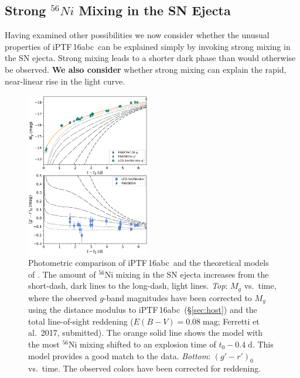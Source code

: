 \documentclass[twocolumn]{aastex61}
\newcommand{\abc}{iPTF\,16abc}
\begin{document}
\subsection{Strong $^{56}Ni$ Mixing in the SN Ejecta}
\label{sec:Ni_mixing}

Having examined other possibilities we now consider whether the unusual
properties of \abc\ can be explained simply by invoking strong mixing in the
SN ejecta. Strong mixing leads to a shorter dark phase than would otherwise
be observed. \textbf{We also consider} whether strong mixing can explain the
rapid, near-linear rise in the light curve.

\begin{figure}[]
  \centering
  \includegraphics[width=0.48\textwidth]{iPTF16abc_Ni_lc.pdf}
  \caption{Photometric comparison of \abc\ and the theoretical 
  models of \citet{2016ApJ...826...96P}. The amount of $^{56}$Ni 
  mixing in the SN ejecta increases from the short-dash, dark lines 
  to the long-dash, light lines.
  \textit{Top}: $M_g$ vs.\ time, where the observed $g$-band 
  magnitudes  
  have been corrected to $M_g$ using the distance modulus to \abc\ 
  (\S\ref{sec:host})
  and the total line-of-sight reddening ($E(B-V) = 0.08 \; 
  \mathrm{mag}$; Ferretti et al.\ 2017, submitted). The orange 
  solid line shows the model with the most $^{56}$Ni mixing 
  shifted to an explosion time of $t_0 - 0.4 \; \mathrm{d}$. This 
  model provides a good match to the data.
  \textit{Bottom}: $(g' - r')_0$ vs.\ time. The observed colors 
  have been corrected for reddening.
  }
  \label{fig:Ni56LC}
\end{figure}
\end{document}
